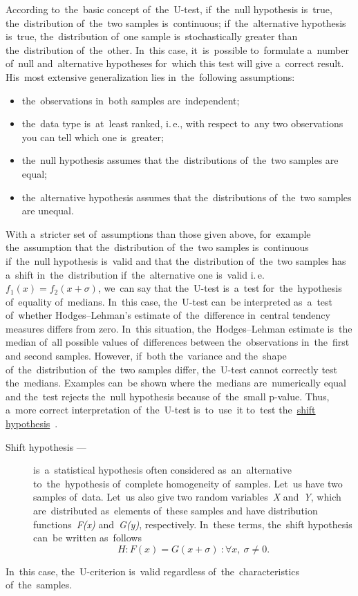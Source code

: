 \documentclass[russian,english]{scrreprt}
\begin{document}
According to~the~basic concept of~the~U-test, if~the~null hypothesis is~true, the~distribution of~the~two samples is~continuous; if~the~alternative hypothesis is~true, the~distribution of~one sample is~stochastically greater than the~distribution of~the~other. In~this case, it~is~possible to~formulate a~number of~null and~alternative hypotheses for~which this test will give a~correct result. His~most extensive generalization lies in~the~following assumptions:
\begin{itemize}
	\item the~observations in~both samples are~independent;
	\item the~data type is~at~least ranked, i.\,e., with respect to~any two observations you can tell which one is~greater;
	\item the~null hypothesis assumes that the~distributions of~the~two samples are equal;
	\item the~alternative hypothesis assumes that the~distributions of~the~two samples are unequal.
\end{itemize}
With a~stricter set of~assumptions than those given above, for~example the~assumption that the~distribution of~the~two samples is~continuous if~the~null hypothesis is~valid and that the~distribution of~the~two samples has a~shift  in~the~distribution if~the~alternative one is~valid i.\,e.~$f_{1}(x)=f_{2}(x+\sigma)$,  we~can say that the~U-test is~a~test for~the~hypothesis of~equality of~medians. In~this case, the~U-test can~be interpreted as~a~test of~whether Hodges--Lehman's estimate of~the~difference in~central tendency measures differs from zero. In~this situation, the~Hodges--Lehman estimate is~the median of~all possible values of~differences between the~observations in~the~first and second samples. However, if~both the~variance and the~shape of~the~distribution of~the~two samples differ, the~U-test cannot correctly test the~medians. Examples can~be shown where the~medians are~numerically equal and the~test rejects the~null hypothesis because of~the~small p-value. Thus, a~more correct interpretation of~the~U-test is~to~use~it to~test the~\href{http://www.machinelearning.ru/wiki/index.php?title=Гипотеза_сдвига}{shift hypothesis}~\cite{MLRU:shift-hypothesis}.
\begin{description}
	\item[Shift hypothesis ---] is~a~statistical hypothesis often considered as~an~alternative to~the~hypothesis of~complete homogeneity of~samples. Let~us have two samples of~data. Let~us also give two random variables~\textit{X} and~\textit{Y}, which are~distributed as~elements of~these samples and have distribution functions~\textit{F(x)} and~\textit{G(y)}, respectively. In~these terms, the~shift hypothesis can~be written as~follows
	\begin{equation}\label{eq:shift-hypothesis}
	H:F(x)=G(x+\sigma)\ : \forall x,\ \sigma \neq 0.
	\end{equation}
\end{description}
In~this case, the~U-criterion is~valid regardless of~the~characteristics of~the~samples.
\end{document}
